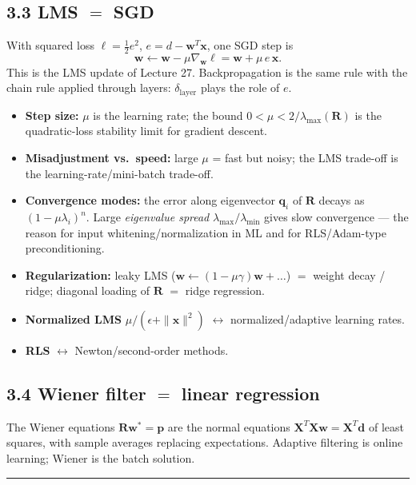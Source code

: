 \documentclass[11pt,a4paper]{article}
\begin{document}
\subsection{3.3 LMS $=$ SGD}
With squared loss $\ell = \tfrac12 e^2$, $e = d - \mathbf{w}^T\mathbf{x}$, one SGD step is
\begin{equation}
\mathbf{w}\leftarrow \mathbf{w} - \mu\nabla_{\mathbf{w}}\ell = \mathbf{w} + \mu\, e\,\mathbf{x}.
\end{equation}
This is the LMS update of Lecture 27. Backpropagation is the same rule with the chain rule applied through layers: $\delta_{\text{layer}}$ plays the role of $e$.
\begin{itemize}
    \item \textbf{Step size:} $\mu$ is the learning rate; the bound $0<\mu<2/\lambda_{\max}(\mathbf{R})$ is the quadratic-loss stability limit for gradient descent.
    \item \textbf{Misadjustment vs.\ speed:} large $\mu$ = fast but noisy; the LMS trade-off is the learning-rate/mini-batch trade-off.
    \item \textbf{Convergence modes:} the error along eigenvector $\mathbf{q}_i$ of $\mathbf{R}$ decays as $(1-\mu\lambda_i)^n$. Large \emph{eigenvalue spread} $\lambda_{\max}/\lambda_{\min}$ gives slow convergence --- the reason for input whitening/normalization in ML and for RLS/Adam-type preconditioning.
    \item \textbf{Regularization:} leaky LMS ($\mathbf{w}\leftarrow(1-\mu\gamma)\mathbf{w}+\dots$) $=$ weight decay / ridge; diagonal loading of $\mathbf{R}$ $=$ ridge regression.
    \item \textbf{Normalized LMS} $\mu/(\epsilon+\|\mathbf{x}\|^2)$ $\leftrightarrow$ normalized/adaptive learning rates.
    \item \textbf{RLS} $\leftrightarrow$ Newton/second-order methods.
\end{itemize}

\subsection{3.4 Wiener filter $=$ linear regression}
The Wiener equations $\mathbf{R}\mathbf{w}^\ast=\mathbf{p}$ are the normal equations $\mathbf{X}^T\mathbf{X}\mathbf{w}=\mathbf{X}^T\mathbf{d}$ of least squares, with sample averages replacing expectations. Adaptive filtering is online learning; Wiener is the batch solution.

\noindent\rule{\textwidth}{0.5pt}
\end{document}
